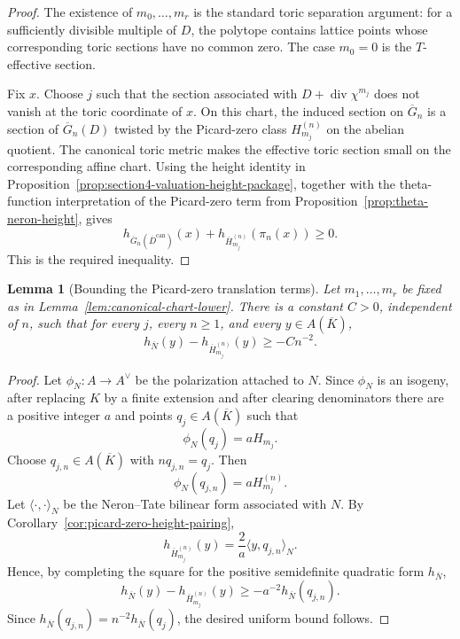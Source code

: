 \documentclass[10pt,a4paper]{amsart}
\theoremstyle{plain}
\newtheorem{lemma}[theorem]{Lemma}
\theoremstyle{plain}
\numberwithin{equation}{section}
\providecommand{\can}{\operatorname{can}}
\begin{document}
\begin{proof}
	The existence of \(m_0,\ldots,m_r\) is the standard toric separation argument:
	for a sufficiently divisible multiple of \(D\), the polytope contains lattice
	points whose corresponding toric sections have no common zero.  The case
	\(m_0=0\) is the \(T\)-effective section.
	
	Fix \(x\).  Choose \(j\) such that the section associated with
	\(D+\operatorname{div}\chi^{m_j}\) does not vanish at the toric coordinate of
	\(x\).  On this chart, the induced section on \(\overline G_n\) is a section of
	\(\overline G_n(D)\) twisted by the Picard-zero class \(H^{(n)}_{m_j}\) on the
	abelian quotient.  The canonical toric metric makes the effective toric section
	small on the corresponding affine chart.  Using the height identity in
	Proposition~\ref{prop:section4-valuation-height-package}, together with the
	theta-function interpretation of the Picard-zero term from
	Proposition~\ref{prop:theta-neron-height}, gives
	\[
	h_{\overline G_n(\overline D^{\can})}(x)
	+h_{\overline H^{(n)}_{m_j}}(\pi_n(x))\ge0.
	\]
	This is the required inequality.
\end{proof}

\begin{lemma}[Bounding the Picard-zero translation terms]
	\label{lem:picard-translation-bound}
	Let \(m_1,\ldots,m_r\) be fixed as in
	Lemma~\ref{lem:canonical-chart-lower}.  There is a constant \(C>0\), independent
	of \(n\), such that for every \(j\), every \(n\ge1\), and every
	\(y\in A(\overline K)\),
	\[
	h_{\overline N}(y)-h_{\overline H^{(n)}_{m_j}}(y)\ge -Cn^{-2}.
	\]
\end{lemma}

\begin{proof}
	Let \(\phi_N:A\to A^\vee\) be the polarization attached to \(N\).  Since
	\(\phi_N\) is an isogeny, after replacing \(K\) by a finite extension and after
	clearing denominators there are a positive integer \(a\) and points
	\(q_j\in A(\overline K)\) such that
	\[
	\phi_N(q_j)=aH_{m_j}.
	\]
	Choose \(q_{j,n}\in A(\overline K)\) with \(nq_{j,n}=q_j\).  Then
	\[
	\phi_N(q_{j,n})=aH^{(n)}_{m_j}.
	\]
	Let \(\langle\cdot,\cdot\rangle_N\) be the Neron--Tate bilinear form associated
	with \(N\).  By Corollary~\ref{cor:picard-zero-height-pairing},
	\[
	h_{\overline H^{(n)}_{m_j}}(y)
	=
	\frac{2}{a}\langle y,q_{j,n}\rangle_N .
	\]
	Hence, by completing the square for the positive semidefinite quadratic form
	\(h_{\overline N}\),
	\[
	h_{\overline N}(y)-h_{\overline H^{(n)}_{m_j}}(y)
	\ge
	-a^{-2}h_{\overline N}(q_{j,n}).
	\]
	Since \(h_{\overline N}(q_{j,n})=n^{-2}h_{\overline N}(q_j)\), the desired
	uniform bound follows.
\end{proof}
\end{document}
